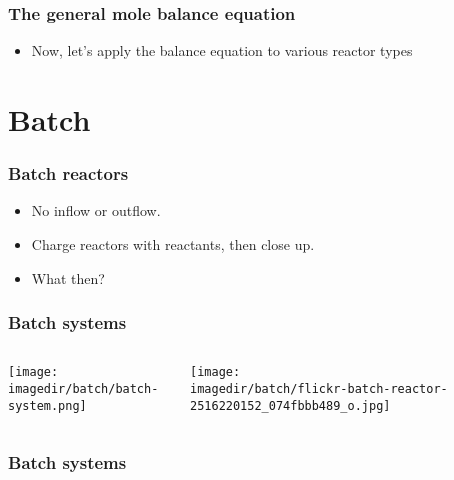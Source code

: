 \begin{frame}\frametitle{The general mole balance equation}
	\begin{itemize}
		\item	Now, let's apply the balance equation to various reactor types 
	\end{itemize}
\end{frame}

\section{Batch}
\begin{frame}\frametitle{Batch reactors}
	\begin{itemize}
		\item	No inflow or outflow.
		\item	Charge reactors with reactants, then close up.
		\item	What then?
	\end{itemize}
\end{frame}

\begin{frame}\frametitle{Batch systems}
	\begin{columns}[t]
			\begin{center}
				\texttt{[image: \\imagedir/batch/batch-system.png]}
			\end{center}
			
			\begin{center}
				\texttt{[image: \\imagedir/batch/flickr-batch-reactor-2516220152\_074fbbb489\_o.jpg]}
			\end{center}
	\end{columns}
\end{frame}

\begin{frame}\frametitle{Batch systems}
	\iftoggle{internal}
	{
		\begin{center}
			\texttt{[image: \\imagedir/reactors/CSTRs/fermenter-not-licensed.jpg]}
		\end{center}
		\vspace{-16pt}
		\see{http://woodmoorbeer.org/Pages/sierra.html}
	}{See illustration at \href{http://woodmoorbeer.org/Pages/sierra.html}{http://woodmoorbeer.org/Pages/sierra.html}}
\end{frame}

